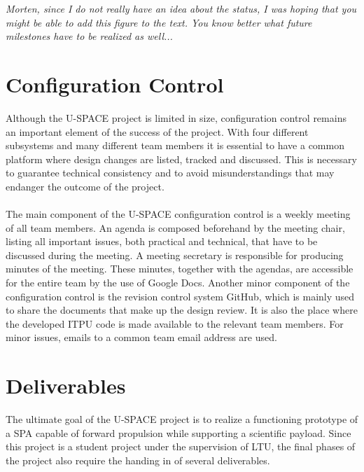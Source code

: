 
\textit{Morten, since I do not really have an idea about the status, I was hoping that you might be able to add this figure to the text. You know better what future milestones have to be realized as well...}

\section{Configuration Control}

Although the \ac{U-SPACE} project is limited in size, configuration control remains an important element of the success of the project. With four different subsystems and many different team members it is essential to have a common platform where design changes are listed, tracked and discussed. This is necessary to guarantee technical consistency and to avoid misunderstandings that may endanger the outcome of the project.
\\
\\
The main component of the \ac{U-SPACE} configuration control is a weekly meeting of all team members. An agenda is composed beforehand by the meeting chair, listing all important issues, both practical and technical, that have to be discussed during the meeting. A meeting secretary is responsible for producing minutes of the meeting. These minutes, together with the agendas, are accessible for the entire team by the use of Google Docs. Another minor component of the configuration control is the revision control system GitHub, which is mainly used to share the documents that make up the design review. It is also the place where the developed \ac{ITPU} code is made available to the relevant team members. For minor issues, emails to a common team email address are used.

\section{Deliverables}

The ultimate goal of the \ac{U-SPACE} project is to realize a functioning prototype of a \ac{SPA} capable of forward propulsion while supporting a scientific payload. Since this project is a student project under the supervision of \ac{LTU}, the final phases of the project also require the handing in of several deliverables.


